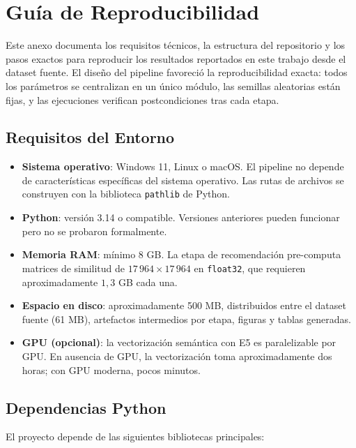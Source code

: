 \chapter{Guía de Reproducibilidad}
\label{app:reproducibilidad}

Este anexo documenta los requisitos técnicos, la estructura del repositorio y los pasos exactos para reproducir los resultados reportados en este trabajo desde el dataset fuente. El diseño del pipeline favoreció la reproducibilidad exacta: todos los parámetros se centralizan en un único módulo, las semillas aleatorias están fijas, y las ejecuciones verifican postcondiciones tras cada etapa.

\section{Requisitos del Entorno}

\begin{itemize}[leftmargin=2em]
    \item \textbf{Sistema operativo}: Windows 11, Linux o macOS. El pipeline no depende de características específicas del sistema operativo. Las rutas de archivos se construyen con la biblioteca \texttt{pathlib} de Python.
    \item \textbf{Python}: versión 3.14 o compatible. Versiones anteriores pueden funcionar pero no se probaron formalmente.
    \item \textbf{Memoria RAM}: mínimo 8 GB. La etapa de recomendación pre-computa matrices de similitud de $17\,964 \times 17\,964$ en \texttt{float32}, que requieren aproximadamente $1{,}3$ GB cada una.
    \item \textbf{Espacio en disco}: aproximadamente 500 MB, distribuidos entre el dataset fuente (61 MB), artefactos intermedios por etapa, figuras y tablas generadas.
    \item \textbf{GPU (opcional)}: la vectorización semántica con E5 es paralelizable por GPU. En ausencia de GPU, la vectorización toma aproximadamente dos horas; con GPU moderna, pocos minutos.
\end{itemize}

\section{Dependencias Python}

El proyecto depende de las siguientes bibliotecas principales:


